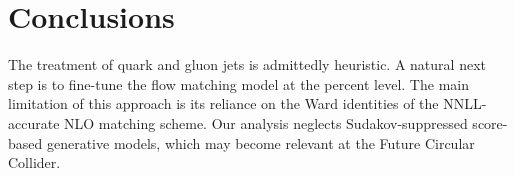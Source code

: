 \section{Conclusions}\label{sec:conclusions}

The treatment of quark and gluon jets is admittedly heuristic. A natural
next step is to fine-tune the flow matching model at the percent level.
The main limitation of this approach is its reliance on the Ward
identities of the NNLL-accurate NLO matching scheme. Our analysis
neglects Sudakov-suppressed score-based generative models, which may
become relevant at the Future Circular Collider.

